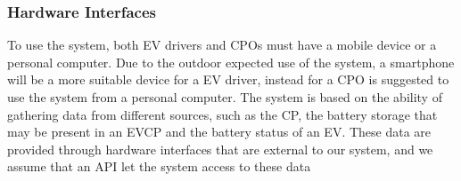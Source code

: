 \begin{figure}[H]
    \centering
    \newline
    \newline
\end{figure}


\subsubsection{Hardware Interfaces}
To use the system, both EV drivers and CPOs must have a mobile device or a personal computer.
Due to the outdoor expected use of the system, a smartphone will be a more suitable device
for a EV driver, instead for a CPO is suggested to use the system from a personal computer.
The system is based on the ability of gathering data from different sources, such as the CP, the battery storage that may be present in an EVCP and the battery status of an EV. These data are provided through hardware interfaces that are external
to our system, and we assume that an API let the system access to these data

